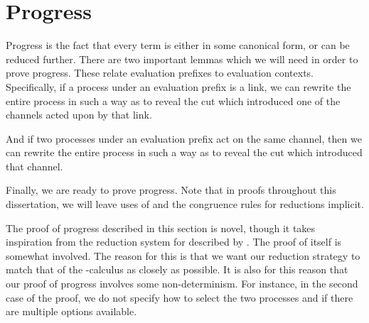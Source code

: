 \section{Progress}\label{sec:cp-progress}
Progress is the fact that every term is either in some canonical form, or can be
reduced further.
%
There are two important lemmas which we will need in order to prove progress.
These relate evaluation prefixes to evaluation contexts.
%
Specifically, if a process under an evaluation prefix is a link, we can rewrite
the entire process in such a way as to reveal the cut which introduced one of
the channels acted upon by that link.

And if two processes under an evaluation prefix act on the same channel, then we
can rewrite the entire process in such a way as to reveal the cut which
introduced that channel. 


Finally, we are ready to prove progress.
Note that in proofs throughout this dissertation, we will leave uses of
\cpRedGammaEquiv and the congruence rules for reductions implicit. 

The proof of progress described in this section is novel, though it takes
inspiration from the reduction system for \cp described by . 
The proof of itself is somewhat involved. The reason for
this is that we want our reduction strategy to match that of the
\textpi-calculus as closely as possible.
It is also for this reason that our proof of progress involves some
non-determinism. For instance, in the second case of the proof, we do not
specify how to select the two processes  and  if there are
multiple options available.

